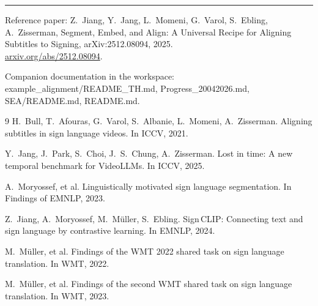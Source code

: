 \documentclass[11pt,a4paper]{article}
\def\texttt#1{#1}%
\def\textit#1{#1}%
\def\emph#1{#1}%
\begin{document}
\bigskip\hrule\bigskip
\noindent\small\textit{Reference paper:}
Z.\ Jiang, Y.\ Jang, L.\ Momeni, G.\ Varol, S.\ Ebling, A.\ Zisserman,
\emph{Segment, Embed, and Align: A Universal Recipe for Aligning Subtitles
to Signing}, arXiv:2512.08094, 2025.\\
\href{https://arxiv.org/abs/2512.08094}{arxiv.org/abs/2512.08094}.

\bigskip\noindent\small\textit{Companion documentation in the workspace:}
\texttt{example\_alignment/README\_TH.md}, \texttt{Progress\_20042026.md},
\texttt{SEA/README.md}, \texttt{README.md}.

\begin{thebibliography}{9}
\small
{}
H.~Bull, T.~Afouras, G.~Varol, S.~Albanie, L.~Momeni, A.~Zisserman.
\newblock Aligning subtitles in sign language videos.
\newblock In \emph{ICCV}, 2021.

Y.~Jang, J.~Park, S.~Choi, J.~S.~Chung, A.~Zisserman.
\newblock Lost in time: A new temporal benchmark for VideoLLMs.
\newblock In \emph{ICCV}, 2025.

A.~Moryossef, et al.
\newblock Linguistically motivated sign language segmentation.
\newblock In \emph{Findings of EMNLP}, 2023.

Z.~Jiang, A.~Moryossef, M.~M{\"u}ller, S.~Ebling.
\newblock Sign\,CLIP: Connecting text and sign language by contrastive learning.
\newblock In \emph{EMNLP}, 2024.

M.~M{\"u}ller, et al.
\newblock Findings of the WMT 2022 shared task on sign language translation.
\newblock In \emph{WMT}, 2022.

M.~M{\"u}ller, et al.
\newblock Findings of the second WMT shared task on sign language translation.
\newblock In \emph{WMT}, 2023.
\end{thebibliography}
\end{document}
